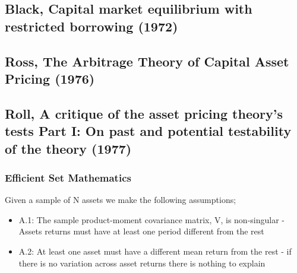 \subsection[Black, 1972]{Black, Capital market equilibrium with restricted borrowing
(1972)\cite{black1972capital}}

\subsection[Ross, 1976]{Ross, The Arbitrage Theory of Capital Asset Pricing
(1976)\cite{ross1976arbitrage}}

\subsection[Roll, 1977]{Roll, A critique of the asset pricing theory's tests Part I: On
past and potential testability of the theory (1977)\cite{roll1977critique}}

\subsubsection{Efficient Set Mathematics}

Given a sample of N assets we make the following assumptions;
\begin{itemize}
    \item A.1: The sample product-moment covariance matrix, V, is non-singular - Assets
    returns must have at least one period different from the rest
    \item A.2: At least one asset must have a different mean return from the rest - if
    there is no variation across asset returns there is nothing to explain
\end{itemize}

